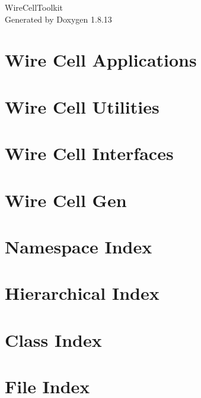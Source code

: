 \documentclass[twoside]{book}
\newcommand{\+}{\discretionary{\mbox{\scriptsize$\hookleftarrow$}}{}{}}
\newcommand{\clearemptydoublepage}{%
  \newpage{\pagestyle{empty}\cleardoublepage}%
}
\begin{document}
\hypersetup{pageanchor=false,
             bookmarksnumbered=true,
             pdfencoding=unicode
            }
\begin{titlepage}
\vspace*{7cm}
\begin{center}%
{\Large Wire\+Cell\+Toolkit }\\
\vspace*{1cm}
{\large Generated by Doxygen 1.8.13}\\
\end{center}
\end{titlepage}
\clearemptydoublepage
{}
\tableofcontents
\clearemptydoublepage
{}
\hypersetup{pageanchor=true}

\chapter{Wire Cell Applications}
\label{md_apps__r_e_a_d_m_e}

\chapter{Wire Cell Utilities}
\label{md_util__r_e_a_d_m_e}

\chapter{Wire Cell Interfaces}
\label{md_iface__r_e_a_d_m_e}

\chapter{Wire Cell Gen}
\label{md_gen__r_e_a_d_m_e}

\chapter{Namespace Index}

\chapter{Hierarchical Index}

\chapter{Class Index}

\chapter{File Index}

\end{document}
